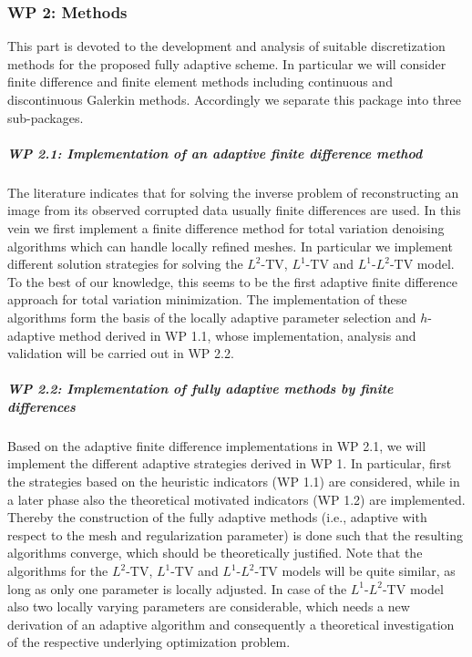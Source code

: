 \documentclass[enabledeprecatedfontcommands,cleardoublepage=empty,headsepline,twoside,11pt,DIV=15,BCOR=12mm,final]{scrartcl}
\begin{document}
  
 
 
\subsubsection*{WP 2: Methods}
This part is devoted to the development and analysis of suitable discretization methods for the proposed fully adaptive scheme.  In particular we will consider finite difference and finite element methods including continuous and discontinuous Galerkin methods. Accordingly we separate this package into three sub-packages.

 
\subparagraph{WP 2.1: Implementation of an adaptive finite difference method}
 
 The literature indicates that for solving the inverse problem of reconstructing an image from its observed corrupted data usually finite differences are used. In this vein we first implement a finite difference method for total variation denoising algorithms which can handle locally refined meshes. In particular we implement different solution strategies for solving the $L^2$-TV, $L^1$-TV and $L^1$-$L^2$-TV model. %
 To the best of our knowledge, this seems to be the first adaptive finite difference approach for total variation minimization. The implementation of these algorithms form the basis of the locally adaptive parameter selection and $h$-adaptive method derived in WP 1.1, whose implementation, analysis and validation will be carried out in WP 2.2. %


 \subparagraph{WP 2.2: Implementation of fully adaptive methods by finite differences}
 
 Based on the adaptive finite difference implementations in WP 2.1, we will implement the different adaptive strategies derived in WP 1. In particular, first the strategies based on the heuristic indicators (WP 1.1) are considered, while in a later phase also the theoretical motivated indicators (WP 1.2) are implemented. Thereby the construction of the fully adaptive methods (i.e., adaptive with respect to the mesh and regularization parameter) is done such that the resulting algorithms converge, which should be theoretically justified. Note that the algorithms for the $L^2$-TV, $L^1$-TV  and $L^1$-$L^2$-TV models will be quite similar, as long as only one parameter is locally adjusted. In case of the $L^1$-$L^2$-TV model also two locally varying parameters are considerable, which needs a new derivation of an adaptive algorithm and consequently a theoretical investigation of the respective underlying optimization problem.  
 
\end{document}
